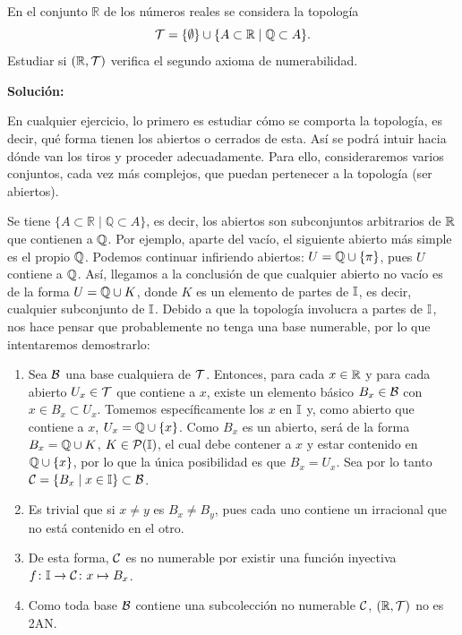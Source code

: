 {}


\begin{ex}
    En el conjunto \(\mathbb{R}\) de los números reales se considera la topología
    \[
        \mathcal{T} = \{\emptyset\} \cup \{A \subset \mathbb{R} \mid \mathbb{Q} \subset A\}.
    \]
    Estudiar si \((\mathbb{R}, \mathcal{T})\) verifica el segundo axioma de numerabilidad.
    \bigskip

    \textbf{Solución:}
    
    En cualquier ejercicio, lo primero es estudiar cómo se comporta la topología, es decir, qué forma tienen los abiertos o cerrados de esta. Así se podrá intuir hacia dónde van los tiros y proceder adecuadamente. Para ello, consideraremos varios conjuntos, cada vez más complejos, que puedan pertenecer a la topología (ser abiertos).

    Se tiene $\{A \subset \mathbb{R} \mid \mathbb{Q} \subset A\}$, es decir, los abiertos son subconjuntos arbitrarios de $\mathbb{R}$ que contienen a $\mathbb{Q}$. Por ejemplo, aparte del vacío, el siguiente abierto más simple es el propio $\mathbb{Q}$. Podemos continuar infiriendo abiertos: $U = \mathbb{Q} \cup \{\pi\}$, pues $U$ contiene a $\mathbb{Q}$. Así, llegamos a la conclusión de que cualquier abierto no vacío es de la forma $U = \mathbb{Q} \cup K$, donde $K$ es un elemento de partes de $\mathbb{I}$, es decir, cualquier subconjunto de $\mathbb{I}$. Debido a que la topología involucra a partes de $\mathbb{I}$, nos hace pensar que probablemente no tenga una base numerable, por lo que intentaremos demostrarlo:

    \begin{enumerate}[topsep=5pt, itemsep=0pt]
        \item Sea $\mathcal{B}$ una base cualquiera de $\mathcal{T}$. Entonces, para cada $x \in \mathbb{R}$ y para cada abierto $U_x \in \mathcal{T}$ que contiene a $x$, existe un elemento básico $B_x\in\mathcal{B}$ con $x\in B_x \subset U_x$. Tomemos específicamente los $x$ en $\mathbb{I}$ y, como abierto que contiene a $x$, $U_x = \mathbb{Q} \cup \{x\}$. Como $B_x$ es un abierto, será de la forma $B_x = \mathbb{Q} \cup K$, $K\in\mathcal{P}(\mathbb{I})$, el cual debe contener a $x$ y estar contenido en $\mathbb{Q} \cup \{x\}$, por lo que la única posibilidad es que $B_x = U_x$. Sea por lo tanto $\mathcal{C} = \{B_x \mid x\in \mathbb{I}\} \subset \mathcal{B}$.
        \item Es trivial que si $x\neq y$ es $B_x \neq B_y$, pues cada uno contiene un irracional que no está contenido en el otro.
        \item De esta forma, $\mathcal{C}$ es no numerable por existir una función inyectiva $f\colon \mathbb{I}\to\mathcal{C} \colon x \mapsto B_x$.
        \item Como toda base $\mathcal{B}$ contiene una subcolección no numerable $\mathcal{C}$, $(\mathbb{R},\mathcal{T})$ no es 2AN.
    \end{enumerate}
\end{ex}

